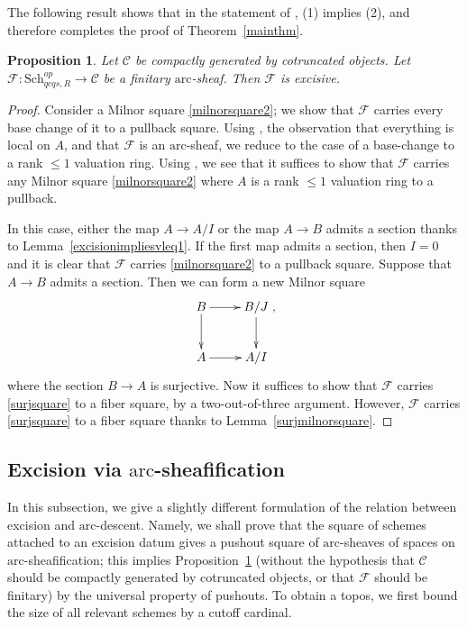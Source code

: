 \documentclass[reqno]{amsart}
\newcommand{\sF}{\mathcal{F}}
\newcommand{\arc}{\mathrm{arc}}
\newtheorem{proposition}[theorem]{Proposition}
\theoremstyle{definition}
\begin{document}
The following result shows that in the statement of , (1) implies (2),  
and therefore completes the proof of Theorem~\ref{mainthm}. 
\begin{proposition} 
\label{arcsheafisexcisive}
Let $\mathcal{C}$ be compactly generated by cotruncated objects. 
Let $\mathcal{F}\colon  \mathrm{Sch}_{qcqs,R}^{op} \to \mathcal{C}$ be a finitary  $\arc$-sheaf. Then $\mathcal{F}$ is excisive. 
\end{proposition} 
\begin{proof} 
Consider a Milnor square \eqref{milnorsquare2}; we show that $\mathcal{F}$
carries every base change of it to 
a pullback square. 
Using , 
the observation that everything is local on $A$, and that $\mathcal{F}$ is an
$\arc$-sheaf, we reduce to the case 
of a base-change to a rank $\leq 1$ valuation ring. 
Using , we see that it suffices to show that 
$\mathcal{F}$ carries any Milnor square \eqref{milnorsquare2}
where $A$ is a rank $\leq 1$ valuation ring to a pullback. 

In this case, either the map $A \to A/I$ or the map $A \to B$ admits a section
thanks to Lemma~\ref{excisionimpliesvleq1}. 
If the first map admits a section, then $I = 0$ and  
it is clear that $\mathcal{F}$ carries \eqref{milnorsquare2}
to a  pullback square. 
Suppose that $A \to B$ admits a section. Then we can form a new Milnor square
\begin{equation}  \label{surjsquare} \xymatrix{
B \ar[d]  \ar[r] &  B/J \ar[d]  \\
A \ar[r] &  A/I
}, \end{equation}
where the section $B \to A$ is surjective. 
Now it suffices to show that $\mathcal{F}$ carries \eqref{surjsquare} to a fiber square,
by a two-out-of-three argument. However, $\mathcal{F}$ carries \eqref{surjsquare} to a
fiber square thanks to  Lemma~\ref{surjmilnorsquare}. 
\end{proof} 

\subsection{Excision via $\arc$-sheafification}
\label{ss:ExcSheaf}

In this subsection, we give a slightly different formulation of the relation
between excision and $\arc$-descent. Namely, we shall prove that the square of
schemes attached to an excision datum gives a pushout square of $\arc$-sheaves
of spaces on $\arc$-sheafification; this implies
Proposition~\ref{arcsheafisexcisive} (without the hypothesis that
$\mathcal{C}$ should be compactly generated by cotruncated objects, or that
$\sF$ should be finitary) by the universal property of pushouts. To obtain a topos, we first bound the size of all relevant schemes by a cutoff cardinal. 
\end{document}
